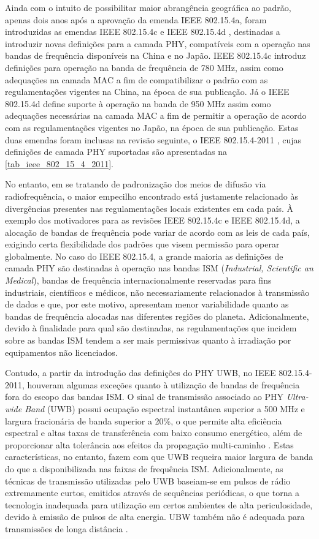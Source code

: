 \documentclass[
	12pt,				%
	openright,			%
	oneside,
	a4paper,			%
	english,			%
	french,				%
	spanish,			%
	brazil				%
	]{abntex2}
\begin{document}
Ainda com o intuito de possibilitar maior abrangência geográfica ao padrão, apenas dois anos após a aprovação da emenda IEEE 802.15.4a, foram introduzidas as emendas IEEE 802.15.4c \cite{IEEE802_15_4c} e IEEE 802.15.4d \cite{IEEE802_15_4d}, destinadas a introduzir novas definições para a camada PHY, compatíveis com a operação nas bandas de frequência disponíveis na China e no Japão. IEEE 802.15.4c introduz definições para operação na banda de frequência de 780 MHz, assim como adequações na camada MAC a fim de compatibilizar o padrão com as regulamentações vigentes na China, na época de sua publicação. Já o IEEE 802.15.4d define suporte à operação na banda de 950 MHz assim como adequações necessárias na camada MAC a fim de permitir a operação de acordo com as regulamentações vigentes no Japão, na época de sua publicação. Estas duas emendas foram inclusas na revisão seguinte, o IEEE 802.15.4-2011 \cite{IEEE802_15_4_2011}, cujas definições de camada PHY suportadas são apresentadas na \autoref{tab_ieee_802_15_4_2011}.

No entanto, em se tratando de padronização dos meios de difusão via radiofrequência, o maior empecilho encontrado está justamente relacionado às divergências presentes nas regulamentações locais existentes em cada país. À exemplo dos motivadores para as revisões IEEE 802.15.4c e IEEE 802.15.4d, a alocação de bandas de frequência pode variar de acordo com as leis de cada país, exigindo certa flexibilidade dos padrões que visem permissão para operar globalmente. No caso do IEEE 802.15.4, a grande maioria as definições de camada PHY são destinadas à operação nas bandas ISM (\textit{Industrial, Scientific an Medical}), bandas de frequência internacionalmente reservadas para fins industriais, científicos e médicos, não necessariamente relacionados à transmissão de dados e que, por este motivo, apresentam menor variabilidade quanto as bandas de frequência alocadas nas diferentes regiões do planeta. Adicionalmente, devido à finalidade para qual são destinadas, as regulamentações que incidem sobre as bandas ISM tendem a ser mais permissivas quanto à irradiação por equipamentos não licenciados.

Contudo, a partir da introdução das definições do PHY UWB, no IEEE 802.15.4-2011, houveram algumas exceções quanto à utilização de bandas de frequência fora do escopo das bandas ISM. O sinal de transmissão associado ao PHY \textit{Ultra-wide Band} (UWB) possui ocupação espectral instantânea superior a 500 MHz e largura fracionária de banda superior a 20\%, o que permite alta eficiência espectral e altas taxas de transferência com baixo consumo energético, além de proporcionar alta tolerância aos efeitos da propagação multi-caminho \cite{Porcino2003}. Estas características, no entanto, fazem com que UWB requeira maior largura de banda do que a disponibilizada nas faixas de frequência ISM. Adicionalmente, as técnicas de transmissão utilizadas pelo UWB baseiam-se em pulsos de rádio extremamente curtos, emitidos através de sequências periódicas, o que torna a tecnologia inadequada para utilização em certos ambientes de alta periculosidade, devido à emissão de pulsos de alta energia. UBW também não é adequada para transmissões de longa distância \cite{Rawat2014}.
\end{document}
